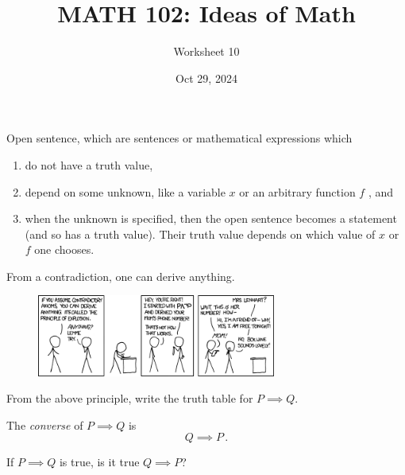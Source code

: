 \documentclass[12pt]{amsart}
\title{ MATH 102: Ideas  of Math }
\author{ Worksheet 10 }
\date{Oct 29, 2024}
\begin{document}
\maketitle

\begin{definition}
	Open sentence, which are sentences or mathematical
	expressions which
	\begin{enumerate}
		\item do not have a truth value,
		\item depend on some unknown, like a variable $x$ or an arbitrary function $f$ , and
		\item when the unknown is specified, then the open sentence becomes a statement (and so has a truth value).
		      Their truth value depends on which value of $x$ or $f$ one chooses.
	\end{enumerate}
\end{definition}


\begin{definition}
	From a contradiction, one can derive anything.
\end{definition}

\begin{figure}[ht]
	\begin{center}
		\includegraphics[width=0.7\textwidth]{explo.png}
	\end{center}
\end{figure}


\begin{problem}
From the above principle, write the truth table for $P \implies Q$.
\end{problem}
\vspace{5cm}

\begin{definition}
	The \emph{converse} of $P \implies Q$ is
	$$Q \implies P \,. $$
\end{definition}

\begin{problem}
If $P \implies Q$ is true, is it true $Q \implies P$?
\end{problem}

\vspace{5cm}
\end{document}
